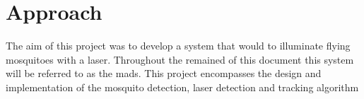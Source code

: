 
\section{Approach}
The aim of this project was to develop a system that would to illuminate flying mosquitoes with a laser. Throughout the remained of this document this system will be referred to as the \gls{mads}. This project encompasses the design and implementation of the mosquito detection, laser detection and tracking algorithm



\newpage


